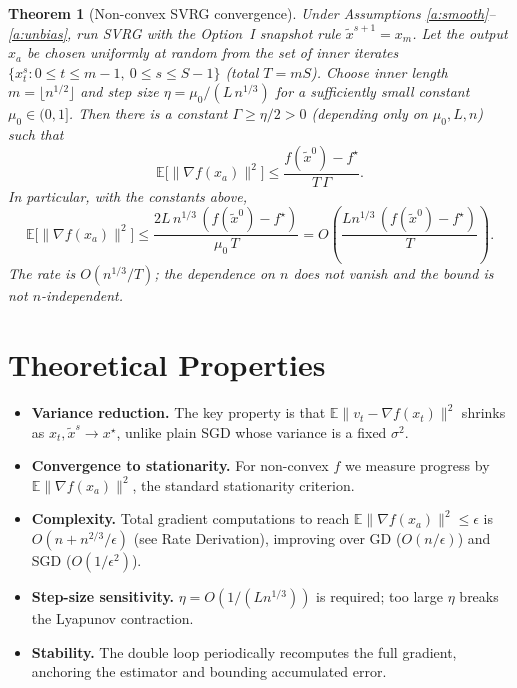 \documentclass[11pt]{article}
\newtheorem{theorem}{Theorem}
\begin{document}
\begin{theorem}[Non-convex SVRG convergence]\label{thm:main}
Under Assumptions \ref{a:smooth}--\ref{a:unbias}, run SVRG with the Option~I snapshot
rule $\tilde{x}^{s+1}=x_m$. Let the output $x_a$ be chosen uniformly at random from
the set of inner iterates $\{x_t^s : 0\le t \le m-1,\ 0\le s\le S-1\}$ (total $T=mS$).
Choose inner length $m = \lfloor n^{1/2}\rfloor$ and step size
$\eta = \mu_0/(L\,n^{1/3})$ for a sufficiently small constant $\mu_0 \in (0,1]$.
Then there is a constant $\Gamma \ge \eta/2 > 0$ (depending only on $\mu_0,L,n$) such that
\[
\mathbb{E}\big[\|\nabla f(x_a)\|^2\big]
\le \frac{f(\tilde{x}^0) - f^\star}{T\,\Gamma}.
\]
In particular, with the constants above,
\[
\mathbb{E}\big[\|\nabla f(x_a)\|^2\big]
\le \frac{2L\,n^{1/3}\,(f(\tilde{x}^0)-f^\star)}{\mu_0\,T}
= O\!\left(\frac{L n^{1/3}\,(f(\tilde{x}^0)-f^\star)}{T}\right).
\]
The rate is $O(n^{1/3}/T)$; the dependence on $n$ does \emph{not} vanish and the bound
is \emph{not} $n$-independent.
\end{theorem}

\section*{Theoretical Properties}

\begin{itemize}
\item \textbf{Variance reduction.} The key property is that
$\mathbb{E}\|v_t - \nabla f(x_t)\|^2$ shrinks as $x_t,\tilde{x}^s \to x^\star$,
unlike plain SGD whose variance is a fixed $\sigma^2$.
\item \textbf{Convergence to stationarity.} For non-convex $f$ we measure progress by
$\mathbb{E}\|\nabla f(x_a)\|^2$, the standard stationarity criterion.
\item \textbf{Complexity.} Total gradient computations to reach
$\mathbb{E}\|\nabla f(x_a)\|^2 \le \epsilon$ is
$O(n + n^{2/3}/\epsilon)$ (see Rate Derivation), improving over GD ($O(n/\epsilon)$)
and SGD ($O(1/\epsilon^2)$).
\item \textbf{Step-size sensitivity.} $\eta = O(1/(Ln^{1/3}))$ is required; too large $\eta$
breaks the Lyapunov contraction.
\item \textbf{Stability.} The double loop periodically recomputes the full gradient,
anchoring the estimator and bounding accumulated error.
\end{itemize}
\end{document}
